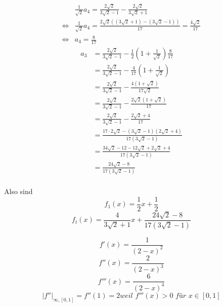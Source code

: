 \documentclass[10pt,a4paper]{article}
\begin{document}
\begin{align*}
  & \frac{1}{\sqrt{2}}a_{4} = \frac{2 \sqrt{2}}{3 \sqrt{2} - 1} - \frac{2 \sqrt{2}}{3 \sqrt{2} + 1}\\
  \Leftrightarrow & \frac{1}{\sqrt{2}}a_{4} = \frac{2 \sqrt{2}((3 \sqrt{2} + 1) - (3 \sqrt{2} - 1))}{17} = \frac{4 \sqrt{2}}{17}\\
  \Leftrightarrow & a_{4} = \frac{8}{17}
\end{align*}
\begin{align*}
  a_{3} & = \frac{2 \sqrt{2}}{3 \sqrt{2} - 1} - \frac{1}{2} \left( 1 + \frac{1}{\sqrt{2}} \right) \frac{8}{17}\\
  & = \frac{2 \sqrt{2}}{3 \sqrt{2} - 1} - \frac{4}{17} \left( 1 + \frac{1}{\sqrt{2}} \right)\\
  & = \frac{2 \sqrt{2}}{3 \sqrt{2} - 1} - \frac{4 (1 + \sqrt{2})}{17 \sqrt{2}}\\
  & = \frac{2 \sqrt{2}}{3 \sqrt{2} - 1} - \frac{2 \sqrt{2} (1 + \sqrt{2})}{17}\\
  & = \frac{2 \sqrt{2}}{3 \sqrt{2} - 1} - \frac{2 \sqrt{2} + 4}{17}\\
  & = \frac{17 \cdot 2 \sqrt{2} - (3 \sqrt{2} - 1)(2 \sqrt{2} + 4)}{17 (3 \sqrt{2} - 1)}\\
  & = \frac{34 \sqrt{2} - 12 - 12 \sqrt{2} + 2 \sqrt{2} + 4}{17 (3 \sqrt{2} - 1)}\\
  & = \frac{24 \sqrt{2} - 8}{17 (3 \sqrt{2} - 1)}\\
\end{align*}

Also sind
\begin{equation}
  f_{1}(x) = \frac{1}{2}x + \frac{1}{2}
\end{equation}
\begin{equation}
  f_{t}(x) = \frac{4}{3\sqrt{2} + 1}x + \frac{24 \sqrt{2} - 8}{17 (3 \sqrt{2} - 1)}
\end{equation}

\begin{equation}
  f'(x) = \frac{1}{(2 - x)^{2}}
\end{equation}
\begin{equation}
  f''(x) = \frac{2}{(2 - x)^{3}}
\end{equation}
\begin{equation}
  f'''(x) = \frac{6}{(2 - x)^{4}}
\end{equation}
\begin{equation}
  |f''|_{\infty, [0, 1]} = f''(1) = 2 \textit{weil $f'''(x) > 0$ für $x \in [0, 1]$}
\end{equation}
\end{document}
